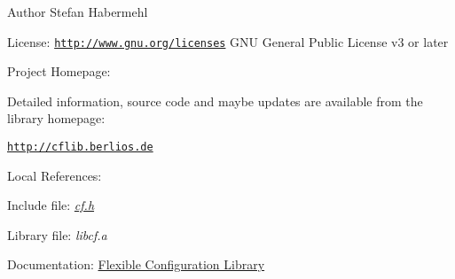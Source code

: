 \begin{DoxyAuthor}{Author}
Stefan Habermehl 
\end{DoxyAuthor}
\begin{DoxyParagraph}{License\-:}
\href{http://www.gnu.org/licenses}{\tt http\-://www.\-gnu.\-org/licenses} G\-N\-U General Public License v3 or later
\end{DoxyParagraph}
\begin{DoxyParagraph}{Project Homepage\-:}

\end{DoxyParagraph}
Detailed information, source code and maybe updates are available from the library homepage\-:


\begin{DoxyItemize}
\item \href{http://cflib.berlios.de}{\tt http\-://cflib.\-berlios.\-de}
\end{DoxyItemize}

\begin{DoxyParagraph}{Local References\-:}

\end{DoxyParagraph}

\begin{DoxyItemize}
\item Include file\-: {\itshape \hyperlink{cf_8h}{cf.\-h}\/} 
\begin{DoxyItemize}
\item Library file\-: {\itshape libcf.\-a\/} 
\item Documentation\-: \hyperlink{group__cflib}{Flexible Configuration Library} 
\end{DoxyItemize}
\end{DoxyItemize}